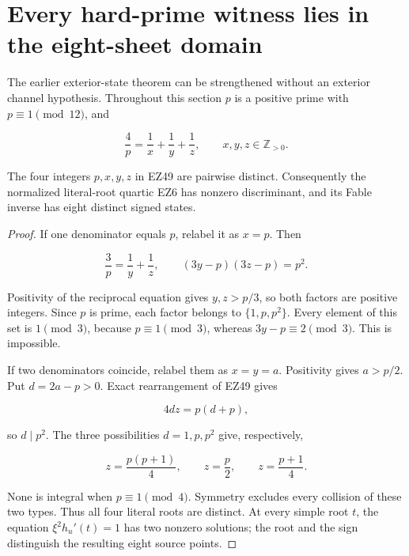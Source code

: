 \section{Every hard-prime witness lies in the eight-sheet domain}
\label{sec:hard-prime-domain}

The earlier exterior-state theorem can be strengthened without an exterior
channel hypothesis.  Throughout this section \(p\) is a positive prime with
\(p\equiv1\pmod {12}\), and

\begin{equation}
 \frac4p=\frac1x+\frac1y+\frac1z,
 \qquad x,y,z\in\mathbb Z_{>0}.                       \tag{EZ49}
\end{equation}

\begin{theorem}
\label{thm:hard-prime-distinct}
The four integers \(p,x,y,z\) in EZ49 are pairwise distinct.  Consequently
the normalized literal-root quartic EZ6 has nonzero discriminant, and its
Fable inverse has eight distinct signed states.
\end{theorem}

\begin{proof}
If one denominator equals \(p\), relabel it as \(x=p\).  Then

\[
 \frac3p=\frac1y+\frac1z,
 \qquad (3y-p)(3z-p)=p^2.
\]

Positivity of the reciprocal equation gives \(y,z>p/3\), so both factors are
positive integers.  Since \(p\) is prime, each factor belongs to
\(\{1,p,p^2\}\).  Every element of this set is \(1\pmod3\), because
\(p\equiv1\pmod3\), whereas \(3y-p\equiv2\pmod3\).  This is impossible.

If two denominators coincide, relabel them as \(x=y=a\).  Positivity gives
\(a>p/2\).  Put \(d=2a-p>0\).  Exact rearrangement of EZ49 gives

\[
 4dz=p(d+p),
\]

so \(d\mid p^2\).  The three possibilities \(d=1,p,p^2\) give, respectively,

\[
 z=\frac{p(p+1)}4,\qquad z=\frac p2,\qquad z=\frac{p+1}4.
\]

None is integral when \(p\equiv1\pmod4\).  Symmetry excludes every collision
of these two types.  Thus all four literal roots are distinct.  At every
simple root \(t\), the equation \(\xi^2h_u'(t)=1\) has two nonzero solutions;
the root and the sign distinguish the resulting eight source points.
\end{proof}

